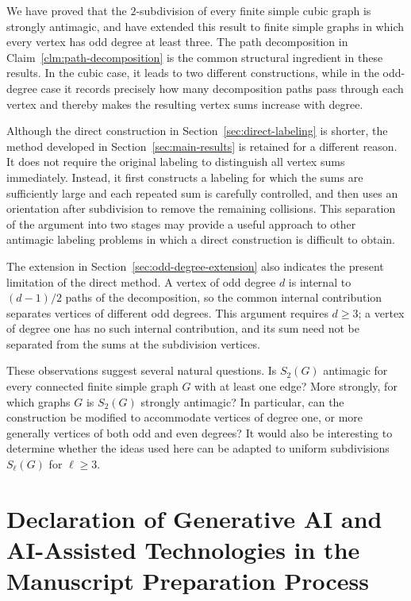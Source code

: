\documentclass[preprint,12pt]{elsarticle}
\begin{document}
We have proved that the \(2\)-subdivision of every finite simple cubic
graph is strongly antimagic, and have extended this result to finite
simple graphs in which every vertex has odd degree at least three. The
path decomposition in Claim~\ref{clm:path-decomposition} is the common
structural ingredient in these results. In the cubic case, it leads to two
different constructions, while in the odd-degree case it records
precisely how many decomposition paths pass through each vertex and
thereby makes the resulting vertex sums increase with degree.

Although the direct construction in
Section~\ref{sec:direct-labeling} is shorter, the method developed in
Section~\ref{sec:main-results} is retained for a different reason. It does
not require the original labeling to distinguish all vertex sums
immediately. Instead, it first constructs a labeling for which the sums
are sufficiently large and each repeated sum is carefully controlled, and
then uses an orientation after subdivision to remove the remaining
collisions. This separation of the argument into two stages may provide a
useful approach to other antimagic labeling problems in which a direct
construction is difficult to obtain.

The extension in Section~\ref{sec:odd-degree-extension} also indicates
the present limitation of the direct method. A vertex of odd degree \(d\)
is internal to \((d-1)/2\) paths of the decomposition, so the common
internal contribution separates vertices of different odd degrees. This
argument requires \(d\ge3\); a vertex of degree one has no such internal
contribution, and its sum need not be separated from the sums at the
subdivision vertices.

These observations suggest several natural questions. Is \(S_2(G)\)
antimagic for every connected finite simple graph \(G\) with at least one
edge? More strongly, for which graphs \(G\) is \(S_2(G)\) strongly
antimagic? In particular, can the construction be modified to accommodate
vertices of degree one, or more generally vertices of both odd and even
degrees? It would also be interesting to determine whether the ideas used
here can be adapted to uniform subdivisions \(S_\ell(G)\) for
\(\ell\ge3\).


\section*{Declaration of Generative AI and AI-Assisted Technologies in the Manuscript Preparation Process}
\end{document}
